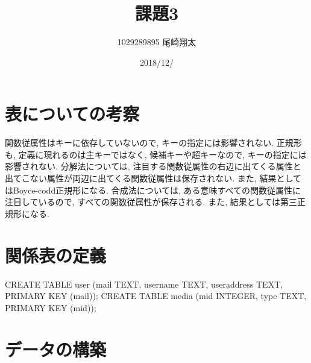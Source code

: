 \documentclass{jarticle}
\begin{document}
\title{課題3}
\author{1029289895 尾崎翔太}
\date{2018/12/}

\maketitle
\newpage


\section{表についての考察}
関数従属性はキーに依存していないので, キーの指定には影響されない. 正規形も, 定義に現れるのは主キーではなく, 候補キーや超キーなので, キーの指定には影響されない. 分解法については, 注目する関数従属性の右辺に出てくる属性と出てこない属性が両辺に出てくる関数従属性は保存されない. また, 結果としてはBoyce-codd正規形になる. 合成法については, ある意味すべての関数従属性に注目しているので, すべての関数従属性が保存される. また, 結果としては第三正規形になる.

\section{関係表の定義}
CREATE TABLE user (mail TEXT, username TEXT, useraddress TEXT, PRIMARY KEY (mail));
CREATE TABLE media (mid INTEGER, type TEXT, PRIMARY KEY (mid));
\section{データの構築}
\end{document}
